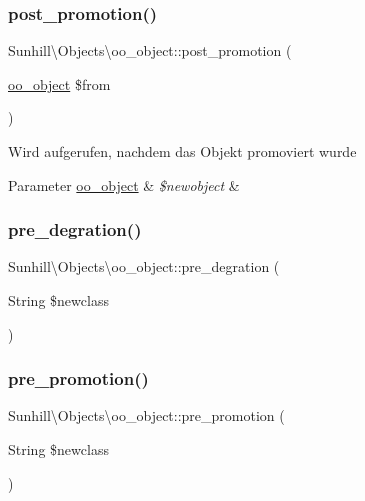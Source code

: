 \subsubsection{\texorpdfstring{post\+\_\+promotion()}{post\_promotion()}}
{\footnotesize\ttfamily Sunhill\textbackslash{}\+Objects\textbackslash{}oo\+\_\+object\+::post\+\_\+promotion (\begin{DoxyParamCaption}\item[{\hyperlink{classSunhill_1_1Objects_1_1oo__object}{oo\+\_\+object}}]{\$from }\end{DoxyParamCaption})}

Wird aufgerufen, nachdem das Objekt promoviert wurde 
\begin{DoxyParams}[1]{Parameter}
\hyperlink{classSunhill_1_1Objects_1_1oo__object}{oo\+\_\+object} & {\em \$newobject} & \\
\hline
\end{DoxyParams}
\mbox{\label{classSunhill_1_1Objects_1_1oo__object_a211152451fe705ec0dbea86737de43a9}} 
\subsubsection{\texorpdfstring{pre\+\_\+degration()}{pre\_degration()}}
{\footnotesize\ttfamily Sunhill\textbackslash{}\+Objects\textbackslash{}oo\+\_\+object\+::pre\+\_\+degration (\begin{DoxyParamCaption}\item[{String}]{\$newclass }\end{DoxyParamCaption})\hspace{0.3cm}{\ttfamily [protected]}}

\mbox{\label{classSunhill_1_1Objects_1_1oo__object_ab7ccff8fa3e57c0bc9298951b9fb4eed}} 
\subsubsection{\texorpdfstring{pre\+\_\+promotion()}{pre\_promotion()}}
{\footnotesize\ttfamily Sunhill\textbackslash{}\+Objects\textbackslash{}oo\+\_\+object\+::pre\+\_\+promotion (\begin{DoxyParamCaption}\item[{String}]{\$newclass }\end{DoxyParamCaption})\hspace{0.3cm}{\ttfamily [protected]}}

